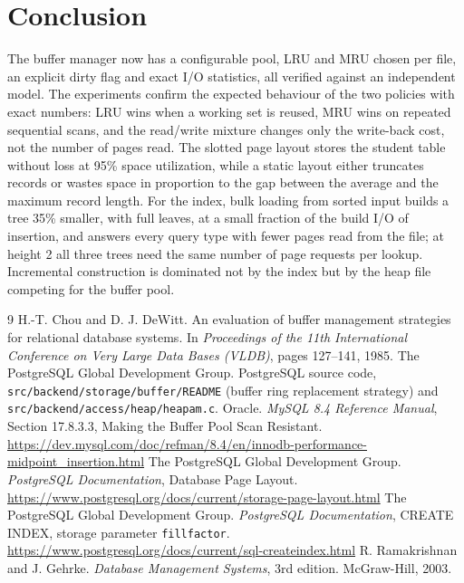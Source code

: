 \documentclass[11pt,a4paper]{article}
\begin{document}
\section{Conclusion}

The buffer manager now has a configurable pool, LRU and MRU chosen per file, an explicit dirty flag and exact I/O statistics, all verified against an independent model. The experiments confirm the expected behaviour of the two policies with exact numbers: LRU wins when a working set is reused, MRU wins on repeated sequential scans, and the read/write mixture changes only the write-back cost, not the number of pages read. The slotted page layout stores the student table without loss at 95\% space utilization, while a static layout either truncates records or wastes space in proportion to the gap between the average and the maximum record length. For the index, bulk loading from sorted input builds a tree 35\% smaller, with full leaves, at a small fraction of the build I/O of insertion, and answers every query type with fewer pages read from the file; at height 2 all three trees need the same number of page requests per lookup. Incremental construction is dominated not by the index but by the heap file competing for the buffer pool.

\begin{thebibliography}{9}
 H.-T. Chou and D. J. DeWitt. An evaluation of buffer management strategies for relational database systems. In \emph{Proceedings of the 11th International Conference on Very Large Data Bases (VLDB)}, pages 127--141, 1985.
 The PostgreSQL Global Development Group. PostgreSQL source code, \texttt{src/backend/storage/buffer/README} (buffer ring replacement strategy) and \texttt{src/backend/access/heap/heapam.c}.
 Oracle. \emph{MySQL 8.4 Reference Manual}, Section 17.8.3.3, Making the Buffer Pool Scan Resistant. \url{https://dev.mysql.com/doc/refman/8.4/en/innodb-performance-midpoint_insertion.html}
 The PostgreSQL Global Development Group. \emph{PostgreSQL Documentation}, Database Page Layout. \url{https://www.postgresql.org/docs/current/storage-page-layout.html}
 The PostgreSQL Global Development Group. \emph{PostgreSQL Documentation}, CREATE INDEX, storage parameter \texttt{fillfactor}. \url{https://www.postgresql.org/docs/current/sql-createindex.html}
 R. Ramakrishnan and J. Gehrke. \emph{Database Management Systems}, 3rd edition. McGraw-Hill, 2003.
\end{thebibliography}
\end{document}
